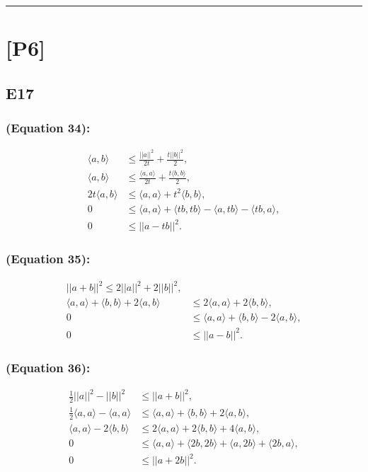 \documentclass[12pt]{article}
\begin{document}
\hrule
\vspace{0.1cm}
\section*{[P6]}
\subsection*{E17}
\subsubsection*{(Equation 34):}
\begin{equation}
    \begin{split}
        \langle a, b \rangle &\leq \frac{||a||^2}{2t} + \frac{t||b||^2}{2}, \\
        \langle a, b \rangle &\leq \frac{\langle a, a \rangle}{2t} + \frac{t \langle b, b \rangle}{2}, \\
        2t \langle a, b \rangle &\leq \langle a, a \rangle + t^2 \langle b, b \rangle, \\
        0 &\leq \langle a, a \rangle + \langle tb, tb \rangle - \langle a, tb \rangle - \langle tb, a \rangle, \\
        0 &\leq ||a - tb||^2. 
    \end{split}
\end{equation}
\subsubsection*{(Equation 35):}
\begin{equation}
    \begin{split}
        ||a+b||^2 \leq 2||a||^2 + 2||b||^2, \\
        \langle a, a\rangle + \langle b, b\rangle + 2 \langle a, b\rangle & \leq 2\langle a, a\rangle + 2\langle b, b\rangle, \\
        0 &\leq \langle a, a\rangle + \langle b, b\rangle -  2 \langle a, b\rangle, \\
        0 &\leq ||a-b||^2.
    \end{split}    
\end{equation}
\subsubsection*{(Equation 36):}
\begin{equation}
    \begin{split}
        \frac{1}{2}||a||^2 - ||b||^2 &\leq ||a+b||^2,\\
        \frac{1}{2} \langle a, a\rangle - \langle a, a\rangle &\leq \langle a, a\rangle + \langle b, b\rangle + 2 \langle a, b\rangle, \\
        \langle a, a\rangle - 2 \langle b, b\rangle &\leq 2 \langle a, a\rangle + 2 \langle b, b\rangle + 4 \langle a, b\rangle, \\
        0 &\leq \langle a, a\rangle + \langle 2b, 2b\rangle + \langle a, 2b\rangle + \langle 2b, a\rangle, \\
        0 &\leq ||a+2b||^2.
    \end{split}
\end{equation}
\end{document}
